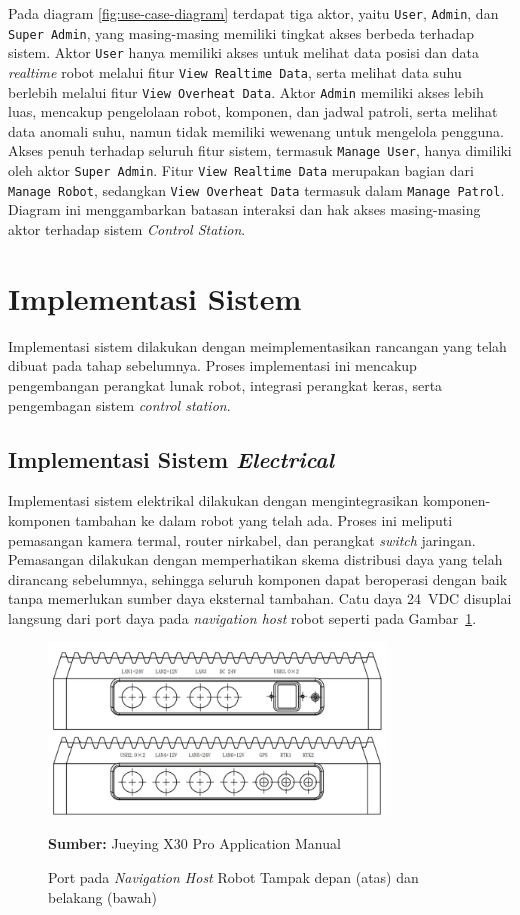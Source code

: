 Pada diagram \ref{fig:use-case-diagram} terdapat tiga aktor, yaitu \texttt{User}, \texttt{Admin}, dan \texttt{Super Admin}, yang masing-masing memiliki tingkat akses berbeda terhadap sistem. Aktor \texttt{User} hanya memiliki akses untuk melihat data posisi dan data \emph{realtime} robot melalui fitur \texttt{View Realtime Data}, serta melihat data suhu berlebih melalui fitur \texttt{View Overheat Data}. Aktor \texttt{Admin} memiliki akses lebih luas, mencakup pengelolaan robot, komponen, dan jadwal patroli, serta melihat data anomali suhu, namun tidak memiliki wewenang untuk mengelola pengguna. Akses penuh terhadap seluruh fitur sistem, termasuk \texttt{Manage User}, hanya dimiliki oleh aktor \texttt{Super Admin}. Fitur \texttt{View Realtime Data} merupakan bagian dari \texttt{Manage Robot}, sedangkan \texttt{View Overheat Data} termasuk dalam \texttt{Manage Patrol}. Diagram ini menggambarkan batasan interaksi dan hak akses masing-masing aktor terhadap sistem \emph{Control Station}.


\section{Implementasi Sistem}
\sloppy
Implementasi sistem dilakukan dengan meimplementasikan rancangan yang telah dibuat pada tahap sebelumnya. Proses implementasi ini mencakup pengembangan perangkat lunak robot, integrasi perangkat keras, serta pengembagan sistem \emph{control station}.

\subsection{Implementasi Sistem \emph{Electrical}}
Implementasi sistem elektrikal dilakukan dengan mengintegrasikan komponen-komponen tambahan ke dalam robot yang telah ada. Proses ini meliputi pemasangan kamera termal, router nirkabel, dan perangkat \emph{switch} jaringan. Pemasangan dilakukan dengan memperhatikan skema distribusi daya yang telah dirancang sebelumnya, sehingga seluruh komponen dapat beroperasi dengan baik tanpa memerlukan sumber daya eksternal tambahan. Catu daya 24~VDC disuplai langsung dari port daya pada \emph{navigation host} robot seperti pada Gambar~\ref{fig:int-control-port}. 

\begin{figure}[H]
  \centering
  \includegraphics[width=0.8\textwidth]{gambar/bab3/int-control-port.png}
  \caption{Port pada \emph{Navigation Host} Robot  Tampak depan (atas) dan belakang (bawah)}
  \label{fig:int-control-port}
  \footnotesize{\textbf{Sumber:} Jueying X30 Pro Application Manual}
\end{figure}

